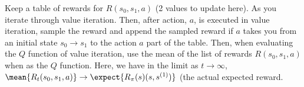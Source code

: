 Keep a table of rewards for $R(s_0, s_1,a)$ (2 values to update here). As you iterate through value iteration. Then, after action, $a$, is executed in value iteration, sample the reward and append the sampled reward if $a$ takes you from an initial state $s_0 \rightarrow s_1$ to the action $a$ part of the table. Then, when evaluating the $Q$ function of value iteration, use the mean of the list of rewards $R(s_0, s_1, a)$ when as the $Q$ function. 
Here, we have in the limit as $t \rightarrow \infty$, $\mean \{R_t(s_0, s_1, a)\} \rightarrow \expect{R_\pi(s)(s,s^{(1)})}$ (the actual expected reward.